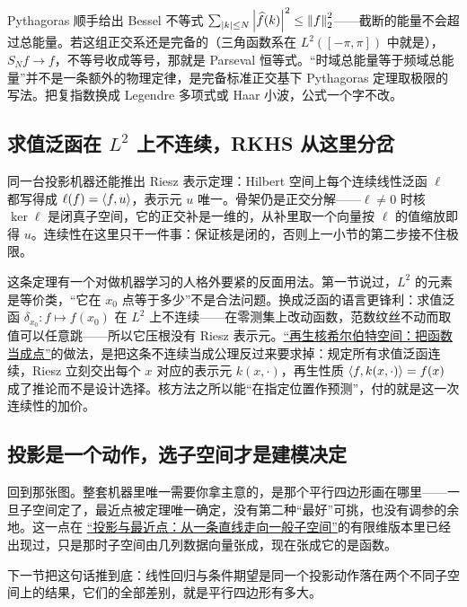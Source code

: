 Pythagoras 顺手给出 Bessel 不等式 \(\sum_{|k|\le N}\left|\widehat f(k)\right|^2\le\left\lVert f\right\rVert_2^2\)——截断的能量不会超过总能量。若这组正交系还是完备的（三角函数系在 \(L^2([-\pi,\pi])\) 中就是），\(S_Nf\to f\)，不等号收成等号，那就是 Parseval 恒等式。``时域总能量等于频域总能量''并不是一条额外的物理定律，是完备标准正交基下 Pythagoras 定理取极限的写法。把复指数换成 Legendre 多项式或 Haar 小波，公式一个字不改。

\subsection{\texorpdfstring{求值泛函在 \(L^2\) 上不连续，RKHS 从这里分岔}{求值泛函在 L2 上不连续，RKHS 从这里分岔}}

同一台投影机器还能推出 Riesz 表示定理：Hilbert 空间上每个连续线性泛函 \(\ell\) 都写得成 \(\ell(f)=\left\langle f,u\right\rangle\)，表示元 \(u\) 唯一。骨架仍是正交分解——\(\ell\neq0\) 时核 \(\ker\ell\) 是闭真子空间，它的正交补是一维的，从补里取一个向量按 \(\ell\) 的值缩放即得 \(u\)。连续性在这里只干一件事：保证核是闭的，否则上一小节的第二步接不住极限。

这条定理有一个对做机器学习的人格外要紧的反面用法。第一节说过，\(L^2\) 的元素是等价类，``它在 \(x_0\) 点等于多少''不是合法问题。换成泛函的语言更锋利：求值泛函 \(\delta_{x_0}:f\mapsto f(x_0)\) 在 \(L^2\) 上不连续——在零测集上改动函数，范数纹丝不动而取值可以任意跳——所以它压根没有 Riesz 表示元。\hyperref[sec:13-Machine-Learning/09-Kernel-Methods-and-Gaussian-Processes/03]{``再生核希尔伯特空间：把函数当成点''}的做法，是把这条不连续当成公理反过来要求掉：规定所有求值泛函连续，Riesz 立刻交出每个 \(x\) 对应的表示元 \(k(x,\cdot)\)，再生性质 \(\left\langle f,k(x,\cdot)\right\rangle=f(x)\) 成了推论而不是设计选择。核方法之所以能``在指定位置作预测''，付的就是这一次连续性的加价。

\subsection{投影是一个动作，选子空间才是建模决定}

回到那张图。整套机器里唯一需要你拿主意的，是那个平行四边形画在哪里——一旦子空间定了，最近点被定理唯一确定，没有第二种``最好''可挑，也没有调参的余地。这一点在 \hyperref[sec:03-Linear-Algebra/03-Orthogonality/02]{``投影与最近点：从一条直线走向一般子空间''}的有限维版本里已经出现过，只是那时子空间由几列数据向量张成，现在张成它的是函数。

下一节把这句话推到底：线性回归与条件期望是同一个投影动作落在两个不同子空间上的结果，它们的全部差别，就是平行四边形有多大。

